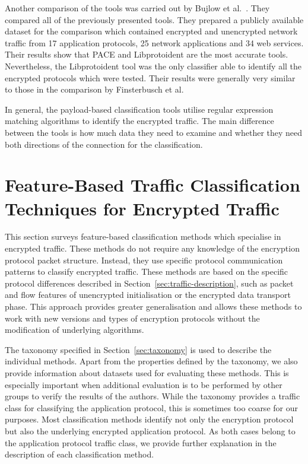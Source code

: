 Another comparison of the tools was carried out by Bujlow et al.~\cite{Bujlow-2015-classification}. They compared all of the previously presented tools. They prepared a publicly available dataset for the comparison which contained encrypted and unencrypted network traffic from 17 application protocols, 25 network applications and 34 web services. Their results show that PACE and Libprotoident are the most accurate tools. Nevertheless, the Libprotoident tool was the only classifier able to identify all the encrypted protocols which were tested. Their results were generally very similar to those in the comparison by Finsterbusch et al.

In general, the payload-based classification tools utilise regular expression matching algorithms to identify the encrypted traffic. The main difference between the tools is how much data they need to examine and whether they need both directions of the connection for the classification.




\section{Feature-Based Traffic Classification Techniques for Encrypted Traffic}\label{sec:detection}


This section surveys feature-based classification methods which specialise in encrypted traffic. These methods do not require any knowledge of the encryption protocol packet structure. Instead, they use specific protocol communication patterns to classify encrypted traffic. These methods are based on the specific protocol differences described in Section~\ref{sec:traffic-description}, such as packet and flow features of unencrypted initialisation or the encrypted data transport phase. This approach provides greater generalisation and allows these methods to work with new versions and types of encryption protocols without the modification of underlying algorithms.

The taxonomy specified in Section~\ref{sec:taxonomy} is used to describe the individual methods. Apart from the properties defined by the taxonomy, we also provide information about datasets used for evaluating these methods. This is especially important when additional evaluation is to be performed by other groups to verify the results of the authors. While the taxonomy provides a traffic class for classifying the application protocol, this is sometimes too coarse for our purposes. Most classification methods identify not only the encryption protocol but also the underlying encrypted application protocol. As both cases belong to the application protocol traffic class, we provide further explanation in the description of each classification method.


